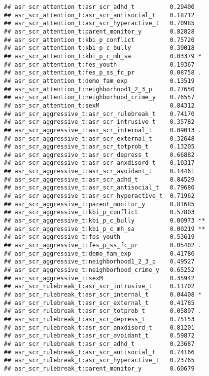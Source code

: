 \documentclass[
]{article}
\begin{document}
\begin{verbatim}
## asr_scr_attention_t:asr_scr_adhd_t          0.29400    
## asr_scr_attention_t:asr_scr_antisocial_t    0.18712    
## asr_scr_attention_t:asr_scr_hyperactive_t   0.70985    
## asr_scr_attention_t:parent_monitor_y        0.82828    
## asr_scr_attention_t:kbi_p_conflict          0.75720    
## asr_scr_attention_t:kbi_p_c_bully           0.39018    
## asr_scr_attention_t:kbi_p_c_mh_sa           0.03379 *  
## asr_scr_attention_t:fes_youth               0.19367    
## asr_scr_attention_t:fes_p_ss_fc_pr          0.08758 .  
## asr_scr_attention_t:demo_fam_exp            0.13519    
## asr_scr_attention_t:neighborhood1_2_3_p     0.77650    
## asr_scr_attention_t:neighborhood_crime_y    0.76557    
## asr_scr_attention_t:sexM                    0.84312    
## asr_scr_aggressive_t:asr_scr_rulebreak_t    0.74170    
## asr_scr_aggressive_t:asr_scr_intrusive_t    0.35782    
## asr_scr_aggressive_t:asr_scr_internal_t     0.09013 .  
## asr_scr_aggressive_t:asr_scr_external_t     0.32648    
## asr_scr_aggressive_t:asr_scr_totprob_t      0.13205    
## asr_scr_aggressive_t:asr_scr_depress_t      0.66882    
## asr_scr_aggressive_t:asr_scr_anxdisord_t    0.10317    
## asr_scr_aggressive_t:asr_scr_avoidant_t     0.14461    
## asr_scr_aggressive_t:asr_scr_adhd_t         0.84529    
## asr_scr_aggressive_t:asr_scr_antisocial_t   0.79680    
## asr_scr_aggressive_t:asr_scr_hyperactive_t  0.71962    
## asr_scr_aggressive_t:parent_monitor_y       0.81685    
## asr_scr_aggressive_t:kbi_p_conflict         0.57803    
## asr_scr_aggressive_t:kbi_p_c_bully          0.00973 ** 
## asr_scr_aggressive_t:kbi_p_c_mh_sa          0.00219 ** 
## asr_scr_aggressive_t:fes_youth              0.53619    
## asr_scr_aggressive_t:fes_p_ss_fc_pr         0.05402 .  
## asr_scr_aggressive_t:demo_fam_exp           0.41786    
## asr_scr_aggressive_t:neighborhood1_2_3_p    0.49527    
## asr_scr_aggressive_t:neighborhood_crime_y   0.65252    
## asr_scr_aggressive_t:sexM                   0.35942    
## asr_scr_rulebreak_t:asr_scr_intrusive_t     0.11702    
## asr_scr_rulebreak_t:asr_scr_internal_t      0.04408 *  
## asr_scr_rulebreak_t:asr_scr_external_t      0.41785    
## asr_scr_rulebreak_t:asr_scr_totprob_t       0.05897 .  
## asr_scr_rulebreak_t:asr_scr_depress_t       0.75153    
## asr_scr_rulebreak_t:asr_scr_anxdisord_t     0.81201    
## asr_scr_rulebreak_t:asr_scr_avoidant_t      0.59872    
## asr_scr_rulebreak_t:asr_scr_adhd_t          0.23687    
## asr_scr_rulebreak_t:asr_scr_antisocial_t    0.74166    
## asr_scr_rulebreak_t:asr_scr_hyperactive_t   0.23765    
## asr_scr_rulebreak_t:parent_monitor_y        0.60679    

\end{verbatim}
\end{document}
